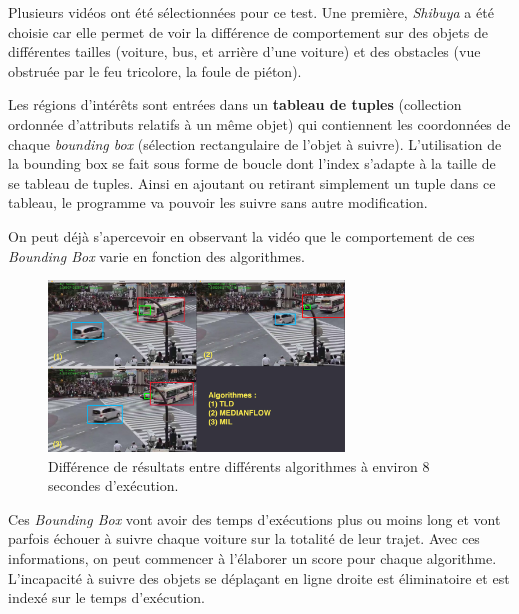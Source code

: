Plusieurs vidéos ont été sélectionnées pour ce test. Une première, \textit{Shibuya} a été choisie car elle permet de voir la différence de comportement sur des objets de différentes tailles (voiture, bus, et arrière d'une voiture) et des obstacles (vue obstruée par le feu tricolore, la foule de piéton).

Les régions d'intérêts sont entrées dans un \textbf{tableau de tuples} (collection ordonnée d'attributs relatifs à un même objet) qui contiennent les coordonnées de chaque \textit{bounding box} (sélection rectangulaire de l'objet à suivre). L'utilisation de la bounding box se fait sous forme de boucle dont l'index s'adapte à la taille de se tableau de tuples. Ainsi en ajoutant ou retirant simplement un tuple dans ce tableau, le programme va pouvoir les suivre sans autre modification.

On peut déjà s'apercevoir en observant la vidéo que le comportement de ces \textit{Bounding Box} varie en fonction des algorithmes.

\begin{figure}[H]
  \includegraphics[width=0.7\textwidth]{img/algodiff.jpg}
    \centering
    \caption{Différence de résultats entre différents algorithmes à environ 8 secondes d'exécution.}
\end{figure}

Ces \textit{Bounding Box} vont avoir des temps d’exécutions plus ou moins long et vont parfois échouer à suivre chaque voiture sur la totalité de leur trajet. Avec ces informations, on peut commencer à l'élaborer un score pour chaque algorithme. L'incapacité à suivre des objets se déplaçant en ligne droite est éliminatoire et est indexé sur le temps d’exécution.

